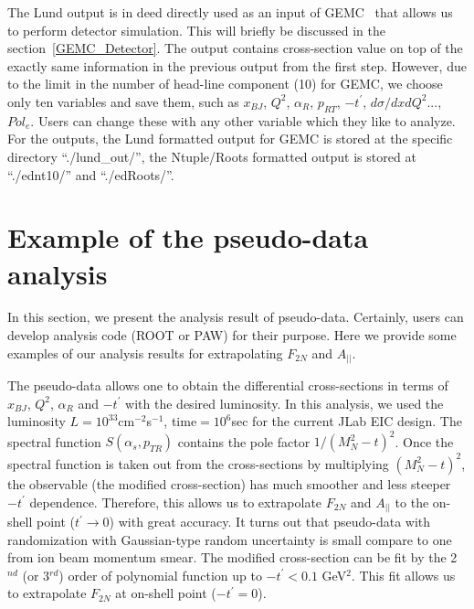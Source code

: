 \documentclass[12pt,letterpaper]{article}
\begin{document}
The Lund output is in deed directly used as an input of GEMC~\cite{EIC_GEMC} that allows us to perform detector simulation. This will briefly be discussed in the section~\ref{GEMC_Detector}.
The output contains cross-section value on top of the exactly same information in the previous output from the first step. However, due to the limit in the number of head-line component (10) for GEMC, we choose only ten variables and save them, such as $x_{BJ}$, $Q^2$, $\alpha_R$, $p_{RT}$, $-t^{\prime}$, $d\sigma/dxdQ^2...$, $Pol_e$. Users can change these with any other variable which they like to analyze. For the outputs, the Lund formatted output for GEMC is stored at the specific directory ``./lund\_out/'', the Ntuple/Roots formatted output is stored at ``./ednt10/'' and ``./edRoots/''.\\




\section{Example of the pseudo-data analysis}
In this section, we present the analysis result of pseudo-data. Certainly, users can develop analysis code (ROOT or PAW) for their purpose. Here we provide some examples of our analysis results for extrapolating $F_{2N}$ and $A_{||}$.


The pseudo-data allows one to obtain the differential cross-sections in terms of $x_{BJ}$, $Q^2$, $\alpha_R$ and $-t^{\prime}$ with the desired luminosity. In this analysis, we used the luminosity $L=10^{33}$cm$^{-2}$s$^{-1}$, time$=10^6$sec for the current JLab EIC design. The spectral function  $S(\alpha_s, p_{TR})$ contains the pole factor $1/(M_N^2-t)^2$. Once the spectral function is taken out from the cross-sections by multiplying $(M_N^2-t)^2$, the observable (the modified cross-section) has much smoother and less steeper $-t^{\prime}$ dependence. Therefore, this allows us to extrapolate $F_{2N}$ and $A_{||}$ to the on-shell point ($t^{\prime}\to 0$) with great accuracy. It turns out that pseudo-data with randomization with Gaussian-type random uncertainty is small compare to one from ion beam momentum smear. The modified cross-section can be fit by the 2$^{nd}$ (or 3$^{rd}$) order of polynomial function up to $-t^{\prime} < 0.1$ GeV$^2$. This  fit allows us to extrapolate $F_{2N}$ at on-shell point ($-t^{\prime}=0$).
\end{document}
